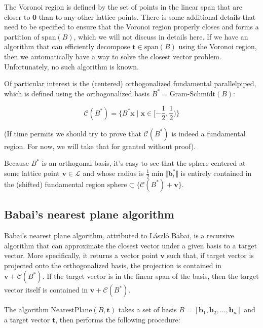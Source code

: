The Voronoi region is defined by the set of points in the linear span that are closer to $\mathbf{0}$ than to any other lattice points. There is some additional details that need to be specified to ensure that the Voronoi region properly closes and forms a partition of $\text{span}(B)$, which we will not discuss in details here. If we have an algorithm that can efficiently decompose $\mathbf{t} \in \text{span}(B)$ using the Voronoi region, then we automatically have a way to solve the closest vector problem. Unfortunately, no such algorithm is known.

Of particular interest is the (centered) orthogonalized fundamental parallelpiped, which is defined using the orthogonalized basis $B^\ast = \text{Gram-Schmidt}(B)$:

$$
\mathcal{C}(B^\ast) = \{B^\ast\mathbf{x} \mid \mathbf{x} \in [-\frac{1}{2}, \frac{1}{2})\}
$$

(If time permits we should try to prove that $\mathcal{C}(B^\ast)$ is indeed a fundamental region. For now, we will take that for granted without proof).

Because $B^\ast$ is an orthogonal basis, it's easy to see that the sphere centered at some lattice point $\mathbf{v} \in \mathcal{L}$ and whose radius is $\frac{1}{2}\min \Vert \mathbf{b}_i^\ast\Vert$ is entirely contained in the (shifted) fundamental region $\text{sphere} \subset \{\mathcal{C}(B^\ast) + \mathbf{v}\}$.

\subsection{Babai's nearest plane algorithm}
Babai's nearest plane algorithm, attributed to László Babai, is a recursive algorithm that can approximate the closest vector under a given basis to a target vector. More specifically, it returns a vector point $\mathbf{v}$ such that, if target vector is projected onto the orthogonalized basis, the projection is contained in $\mathbf{v} + \mathcal{C}(B^\ast)$. If the target vector is in the linear span of the basis, then the target vector itself is contained in $\mathbf{v} + \mathcal{C}(B^\ast)$.

The algorithm $\text{NearestPlane}(B, \mathbf{t})$ takes a set of basis $B = [\mathbf{b}_1, \mathbf{b}_2, \ldots, \mathbf{b}_{n}]$ and a target vector $\mathbf{t}$, then performs the following procedure:

